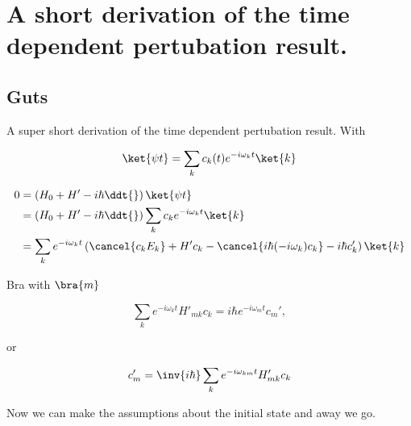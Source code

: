 
%

\chapter{A short derivation of the time dependent pertubation result.}
\label{chap:shortTimeDepPertubation}
{}
\date{Dec 8, 2011}

\beginArtNoToc

\section{Guts}

A super short derivation of the time dependent pertubation result.  With

\begin{equation}\label{eqn:shortTimeDepPertubation:10}
\ket{\psi{t}} = \sum_k c_k(t) e^{-i\omega_k t} \ket{k}
\end{equation}

\begin{align*}
0
&=
\left( H_0 + H' - i\hbar \ddt{} \right)
\ket{\psi{t}} \\
&=
\left( H_0 + H' - i\hbar \ddt{} \right)
\sum_k c_k e^{-i\omega_k t} \ket{k} \\
&=
\sum_k e^{-i\omega_k t} 
\left(
\cancel{c_k E_k} + H' c_k - \cancel{i\hbar (-i \omega_k) c_k} -i\hbar c_k'
\right)
\ket{k}
\end{align*}

Bra with $\bra{m}$

\begin{equation}\label{eqn:shortTimeDepPertubation:30}
\sum_k e^{-i\omega_k t} 
H'_{mk} c_k 
=
i\hbar
e^{-i\omega_m t} 
c_m',
\end{equation}

or

\begin{equation}\label{eqn:shortTimeDepPertubation:50}
c_m'
=
\inv{i\hbar}
\sum_k e^{-i\omega_{km} t} 
H'_{mk} c_k 
\end{equation}

Now we can make the assumptions about the initial state and away we go.

\EndNoBibArticle
